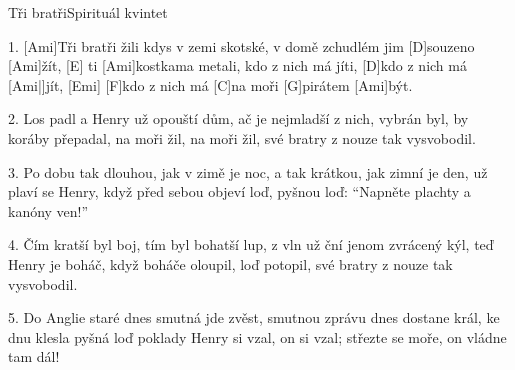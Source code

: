 \begin{song}{Tři bratři}{Spirituál kvintet}

\begin{xverse}{1. }
[Ami]Tři bratři žili kdys v zemi skotské,
v domě zchudlém jim [D]souzeno [Ami]{žít}, [E]{}
ti [Ami]kostkama metali, kdo z nich má jíti,
[D]kdo z nich má [Ami|]{jít,} [Emi]{}
[F]kdo z nich má [C]na moři [G]pirátem [Ami]být.
\end{xverse}


\begin{xverse}{2. }
Los padl a Henry už opouští dům,
ač je nejmladší z nich, vybrán byl,
by koráby přepadal, na moři žil,
na moři žil,
své bratry z nouze tak vysvobodil.
\end{xverse}


\begin{xverse}{3. }
Po dobu tak dlouhou, jak v zimě je noc,
a tak krátkou, jak zimní je den,
už plaví se Henry, když před sebou objeví
loď, pyšnou loď:
``Napněte plachty a kanóny ven!''
\end{xverse}


\begin{xverse}{4. }
Čím kratší byl boj, tím byl bohatší lup,
z vln už ční jenom zvrácený kýl,
teď Henry je boháč, když boháče oloupil,
loď potopil,
své bratry z nouze tak vysvobodil.
\end{xverse}


\begin{xverse}{5. }
Do Anglie staré dnes smutná jde zvěst,
smutnou zprávu dnes dostane král,
ke dnu klesla pyšná loď poklady Henry si
vzal, on si vzal;
střezte se moře, on vládne tam dál!
\end{xverse}
\end{song}

